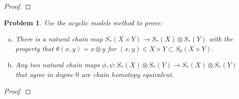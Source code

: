 \documentclass[11pt]{article}
\newtheorem{problem}{Problem}
\begin{document}
\begin{proof}

\end{proof}

\pagebreak 

\begin{problem}
Use the acyclic models method to prove: 
\begin{enumerate}[(a)]
\item There is a natural chain map $S_*(X\times Y)\to S_*(X)\otimes S_*(Y)$ with the property that $\theta(x,y)=x\otimes y$ for $(x,y)\in X\times Y\subset S_0(X\times Y)$. 
\item Any two natural chain maps $\phi,\psi:S_*(X)\otimes S_*(Y)\to S_*(X)\otimes S_*(Y)$ that agree in degree $0$ are chain homotopy equivalent. 
\end{enumerate} 
\end{problem}

\begin{proof}

\end{proof}
\end{document}
